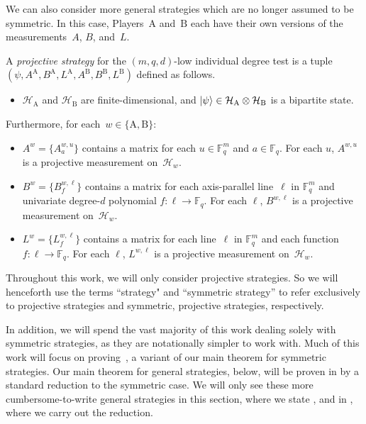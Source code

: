 \documentclass[11pt]{article}
\theoremstyle{definition}
\newcommand{\F}{\mathbb F}
\newcommand{\ot}{\otimes}
\newcommand{\calH}{\mathcal{H}}
\begin{document}
We can also consider more general strategies which are no longer assumed to be symmetric.
In this case, Players~$\mathrm{A}$ and~$\mathrm{B}$ each have their own versions of the measurements~$A$, $B$, and~$L$.

\begin{definition}
A \emph{projective strategy} for the $(m,q, d)$-low individual degree test
is a tuple $(\psi, A^{\mathrm{A}},B^{\mathrm{A}},L^{\mathrm{A}},A^{\mathrm{B}},B^{\mathrm{B}},L^{\mathrm{B}})$ defined as follows.
\begin{itemize}
\item[$\circ$] $\calH_{\mathrm A}$ and $\calH_{\mathrm B}$ are
finite-dimensional, and
$\ket{\psi} \in \calH_{\mathrm{A}} \ot \calH_{\mathrm{B}}$ is a bipartite state.
\end{itemize}
Furthermore, for each~$w \in \{\mathrm{A}, \mathrm{B}\}$:
\begin{itemize}
\item[$\circ$] $A^{w} = \{A^{w,u}_a\}$ contains a matrix for each $u \in \F_q^m$ and $a \in \F_q$.
			For each $u$, $A^{w,u}$ is a projective measurement on~$\calH_{w}$.
\item[$\circ$] $B^{w} = \{B^{w,\ell}_f\}$ contains a matrix for each axis-parallel line~$\ell$ in $\F_q^m$
			and univariate degree-$d$ polynomial $f:\ell\rightarrow \F_q$.
			For each $\ell$, $B^{w,\ell}$ is a projective measurement on~$\calH_{w}$.
\item[$\circ$] $L^w = \{L^{w,\ell}_f\}$ contains a matrix for each line~$\ell$ in $\F_q^m$
			and each function $f:\ell\rightarrow \F_q$.
			For each $\ell$, $L^{w,\ell}$ is a projective measurement on~$\calH_{w}$.
\end{itemize}
\end{definition}

\begin{remark}
Throughout this work, we will only consider projective strategies.
So we will henceforth use the terms ``strategy" and ``symmetric strategy'' to refer exclusively to projective strategies and symmetric, projective strategies, respectively.

In addition, we will spend the vast majority of this work dealing solely with symmetric strategies, as they are notationally simpler to work with.
Much of this work will focus on proving~,
a variant of our main theorem for symmetric strategies.
Our main theorem for general strategies,  below, will be proven in  by a standard reduction to the symmetric case.
We will only see these more cumbersome-to-write general strategies
in this section, where we state ,
and in , where we carry out the reduction.
\end{remark}
\end{document}
